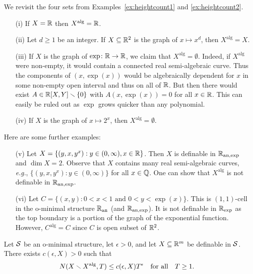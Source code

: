 \begin{example}
  We revisit the four sets from Examples~\ref{ex:heightcount1} and
  \ref{ex:heightcount2}.
  \begin{enumerate}
  \item [(i)] If $X={\mathbb{R}}$ then $X^{\mathrm{alg}}={\mathbb{R}}$.
  \item[(ii)] Let $d\ge 1$ be an integer. If
    $X\subseteq{\mathbb{R}}^2$ is the graph of $x\mapsto x^d$, then
    $X^{\mathrm{alg}}=X$.
  \item[(iii)] If $X$ is the graph of $\exp\colon{\mathbb{R}}\rightarrow{\mathbb{R}}$, we
    claim that $X^{\mathrm{alg}}=\emptyset$. Indeed, if
    $X^{\mathrm{alg}}$ were non-empty, it would contain a connected
    real semi-algebraic curve. Thus the components of $(x,\exp(x))$
    would be algebraically dependent for $x$ in some non-empty open
    interval and thus on all of ${\mathbb{R}}$. But then there would exist
    $A\in {\mathbb{R}}[X,Y]\smallsetminus\{0\}$ with $A(x,\exp(x))=0$ for all $x\in{\mathbb{R}}$.
    This can easily be ruled out as $\exp$
    grows quicker than any polynomial. 
    
  \item[(iv)] If $X$ is the graph of $x\mapsto 2^x$, then
    $X^{\mathrm{alg}}=\emptyset$.    
  \end{enumerate}
  Here are some further examples:
  \begin{enumerate}
  \item [(v)] Let $X = \{(y,x,y^x) : y\in (0,\infty), x\in{\mathbb{R}}\}$. Then
    $X$ is definable in ${{\mathbb{R}}_{\mathrm{an,exp}}}$ and $\dim X = 2$.
    Observe that $X$ contains many real semi-algebraic curves,
    \textit{e.g.}, $\{(y,x,y^x) : y\in (0,\infty)\}$ for all
    $x\in{\mathbb{Q}}$.
    One can show that $X^{\mathrm{alg}}$ is not definable in
    ${{\mathbb{R}}_{\mathrm{an,exp}}}$.

  \item[(vi)] Let $C = \{(x,y) : 0<x<1 \text{ and } 0<y<\exp(x) \}$.
    This is $(1,1)$-cell in the o-minimal structure ${{\mathbb{R}}_{\mathrm{an}}}$ (and
    ${{\mathbb{R}}_{\mathrm{an,exp}}}$). It is not definable in ${{\mathbb{R}}_{\mathrm{exp}}}$ as the top boundary
    is a portion of the graph of the exponential function. However,
    $C^{\mathrm{alg}}=C$ since $C$ is open subset of ${\mathbb{R}}^2$. 
  \end{enumerate}
\end{example}

\begin{theorem}
  \label{thm:pilawilkie}
  Let ${\mathcal S}$ be an o-minimal structure,  let $\epsilon>0$, and let $X\subseteq{\mathbb{R}}^m$ be
  definable in ${\mathcal S}$.
  There exists  $c(\epsilon,X)>0$ such that
  \begin{equation*}
    N(X\smallsetminus X^{\mathrm{alg}},T)\le c(\epsilon,X) T^\epsilon \quad\text{for
      all}\quad T\ge 1.
  \end{equation*}
\end{theorem}

